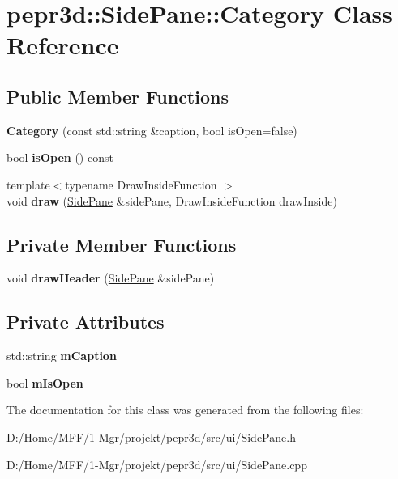 \hypertarget{classpepr3d_1_1_side_pane_1_1_category}{}\section{pepr3d\+::Side\+Pane\+::Category Class Reference}
\label{classpepr3d_1_1_side_pane_1_1_category}
\subsection*{Public Member Functions}
\begin{DoxyCompactItemize}
\item 
\mbox{\label{classpepr3d_1_1_side_pane_1_1_category_acb1fc3a5d7bd9101fcb8f4379cc70a02}} 
{\bfseries Category} (const std\+::string \&caption, bool is\+Open=false)
\item 
\mbox{\label{classpepr3d_1_1_side_pane_1_1_category_aac016fcb205b58448834ba7ccb950b05}} 
bool {\bfseries is\+Open} () const
\item 
\mbox{\label{classpepr3d_1_1_side_pane_1_1_category_a3f0786593b21a0428b8e9b8772f352ef}} 
{\footnotesize template$<$typename Draw\+Inside\+Function $>$ }\\void {\bfseries draw} (\mbox{\hyperlink{classpepr3d_1_1_side_pane}{Side\+Pane}} \&side\+Pane, Draw\+Inside\+Function draw\+Inside)
\end{DoxyCompactItemize}
\subsection*{Private Member Functions}
\begin{DoxyCompactItemize}
\item 
\mbox{\label{classpepr3d_1_1_side_pane_1_1_category_a774041d63e1e1c39dd22f5f221fc6797}} 
void {\bfseries draw\+Header} (\mbox{\hyperlink{classpepr3d_1_1_side_pane}{Side\+Pane}} \&side\+Pane)
\end{DoxyCompactItemize}
\subsection*{Private Attributes}
\begin{DoxyCompactItemize}
\item 
\mbox{\label{classpepr3d_1_1_side_pane_1_1_category_a90d6ee307568b7a321fe9b6b57bfe792}} 
std\+::string {\bfseries m\+Caption}
\item 
\mbox{\label{classpepr3d_1_1_side_pane_1_1_category_a5b8bfd770ebb2c4e786f15ada443efa6}} 
bool {\bfseries m\+Is\+Open}
\end{DoxyCompactItemize}


The documentation for this class was generated from the following files\+:\begin{DoxyCompactItemize}
\item 
D\+:/\+Home/\+M\+F\+F/1-\/\+Mgr/projekt/pepr3d/src/ui/Side\+Pane.\+h\item 
D\+:/\+Home/\+M\+F\+F/1-\/\+Mgr/projekt/pepr3d/src/ui/Side\+Pane.\+cpp\end{DoxyCompactItemize}
